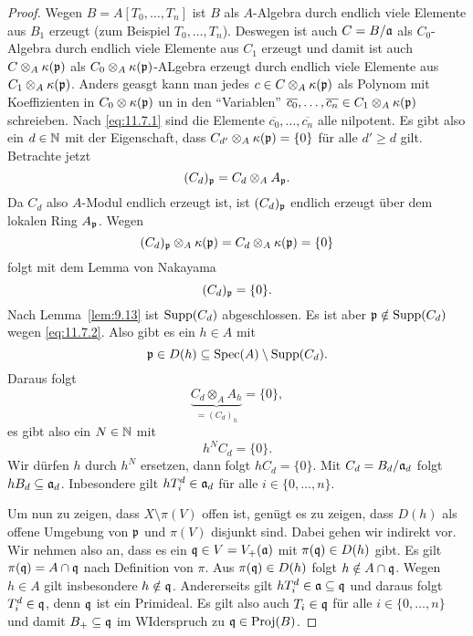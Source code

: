 \begin{thm}
\begin{proof}
		Wegen $B=A[T_0,\ldots,T_n]$ ist $B$ als $A$-Algebra durch endlich viele Elemente aus $B_1$ erzeugt (zum Beispiel $T_0,\ldots,T_n$). Deswegen ist auch $C=B/\mathfrak{a}$ als $C_0$-Algebra durch endlich viele Elemente aus $C_1$ erzeugt und damit ist auch $C\otimes_A\kappa(\mathfrak{p})$ als $C_0\otimes_A\kappa(\mathfrak{p})$-ALgebra erzeugt durch endlich viele Elemente aus $C_1\otimes_A\kappa(\mathfrak{p})$. Anders geasgt kann man jedes $c \in C\otimes_A\kappa(\mathfrak{p})$ als Polynom mit Koeffizienten in $C_0\otimes\kappa(\mathfrak{p})$ un in den \enquote{Variablen} $\overline{c_0},\ldots,\overline{c_n} \in C_1 \otimes_A\kappa(\mathfrak{p})$ schreieben. Nach \eqref{eq:11.7.1} sind  die Elemente $\overline{c_0},\ldots,\overline{c_n}$ alle nilpotent. Es gibt also ein $d \in \mathbb {N}$ mit der Eigenschaft, dass $C_{d'}\otimes_A \kappa(\mathfrak{p}) = \{0\}$ für alle $d'\ge d$ gilt. Betrachte jetzt
		\[
			(C_d)_{\mathfrak{p}} = C_d\otimes_A A_{\mathfrak{p}}.
		\]
		Da $C_d$ also $A$-Modul endlich erzeugt ist, ist $(C_d)_{\mathfrak{p}}$ endlich erzeugt über dem lokalen Ring $A_{\mathfrak{p}}$. Wegen
		\[
			(C_d)_{\mathfrak{p}} \otimes_A \kappa(\mathfrak{p}) = C_d \otimes_A \kappa(\mathfrak{p}) = \{0\}
		\]
		folgt mit dem Lemma von Nakayama
		\begin{equation*}\label{eq:11.7.2}
			(C_d)_{\mathfrak{p}} = \{0\}.
		\end{equation*}
		Nach Lemma~\ref{lem:9.13} ist $\operatorname{Supp}(C_d)$ abgeschlossen. Es ist aber $\mathfrak{p} \notin \operatorname{Supp}(C_d)$ wegen \eqref{eq:11.7.2}. Also gibt es ein $h \in A$ mit
		\[
			\mathfrak{p} \in D(h) \subseteq \operatorname{Spec}(A) \setminus \operatorname{Supp}(C_d).
		\]
		Daraus folgt
		\[
			\underbrace{C_d \otimes_A A_h}_{=(C_d)_h} = \{0\},
		\]
		es gibt also ein $N \in \mathbb {N}$ mit
		\[
			h^N C_d = \{0\}.
		\]
		Wir dürfen $h$ durch $h^N$ ersetzen, dann folgt $hC_d = \{0\}$. Mit $C_d = B_d/\mathfrak{a}_d$ folgt $hB_d \subseteq \mathfrak{a}_d$. Inbesondere gilt $hT_i^d \in \mathfrak{a}_d$ für alle $i \in \{0,\ldots,n\}$.

		Um nun zu zeigen, dass $X \setminus\pi(V)$ offen ist, genügt es zu zeigen, dass $D(h)$ als offene Umgebung von $\mathfrak{p}$ und $\pi(V)$ disjunkt sind. Dabei gehen wir indirekt vor. Wir nehmen also an, dass es ein $\mathfrak{q} \in V = V_+(\mathfrak{a})$ mit $\pi(\mathfrak{q}) \in D(h)$ gibt. Es gilt $\pi(\mathfrak{q}) = A \cap \mathfrak{q}$ nach Definition von $\pi$. Aus $\pi(\mathfrak{q}) \in D(h)$ folgt $h \notin A \cap \mathfrak{q}$. Wegen $h \in A$ gilt insbesondere $h \notin \mathfrak{q}$. Andererseits gilt $h T_i^d \in \mathfrak{a} \subseteq \mathfrak{q}$ und daraus folgt $T_i^d \in \mathfrak{q}$, denn $\mathfrak{q}$ ist ein Primideal. Es gilt also auch $T_i\in \mathfrak{q}$ für alle $i \in \{0,\ldots,n\}$ und damit $B_+ \subseteq \mathfrak{q}$ im WIderspruch zu $\mathfrak{q} \in \operatorname{Proj}(B)$.
	\end{proof}
\end{thm}

